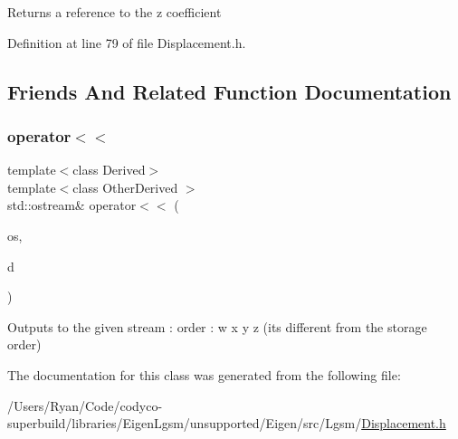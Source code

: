 \begin{DoxyReturn}{Returns}
a reference to the {\ttfamily z} coefficient 
\end{DoxyReturn}


Definition at line 79 of file Displacement.\+h.



\subsection{Friends And Related Function Documentation}
\hypertarget{class_displacement_base_ae3b817959fb2c6e82221c44ff1f3c9d1}{}\label{class_displacement_base_ae3b817959fb2c6e82221c44ff1f3c9d1} 
\subsubsection{\texorpdfstring{operator$<$$<$}{operator<<}}
{\footnotesize\ttfamily template$<$class Derived$>$ \\
template$<$class Other\+Derived $>$ \\
std\+::ostream\& operator$<$$<$ (\begin{DoxyParamCaption}\item[{std\+::ostream \&}]{os,  }\item[{const \hyperlink{class_displacement_base}{Displacement\+Base}$<$ Other\+Derived $>$ \&}]{d }\end{DoxyParamCaption})\hspace{0.3cm}{\ttfamily [friend]}}

Outputs to the given stream \+: order \+: w x y z (it\textquotesingle{}s different from the storage order) 

The documentation for this class was generated from the following file\+:\begin{DoxyCompactItemize}
\item 
/\+Users/\+Ryan/\+Code/codyco-\/superbuild/libraries/\+Eigen\+Lgsm/unsupported/\+Eigen/src/\+Lgsm/\hyperlink{_displacement_8h}{Displacement.\+h}\end{DoxyCompactItemize}
